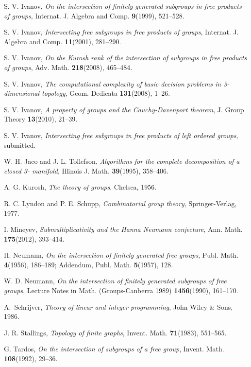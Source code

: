 \documentclass[10pt, reqno]{amsart}
\numberwithin{equation}{section}
\begin{document}
\begin{thebibliography}{[10]}
  S. V. Ivanov, {\em  On the intersection of
finitely generated subgroups in free products of groups},  {
Internat. J. Algebra and Comp.}  {\bf 9}(1999), 521--528.

  S. V. Ivanov, {\em Intersecting free subgroups
in free products of groups},  { Internat. J. Algebra and Comp.}
{\bf 11}(2001), 281--290.

 S. V. Ivanov,  {\em On the Kurosh rank of the
intersection of subgroups in free products of groups}, Adv.  Math. {\bf
218}(2008), 465--484.

 S. V. Ivanov,  {\em The computational complexity of basic decision problems in 3-dimensional topology},  Geom. Dedicata {\bf 131}(2008), 1--26.

  S. V. Ivanov,
{\em A property of groups and the Cauchy-Davenport theorem},
{J. Group Theory} {\bf 13}(2010), 21--39.

  S. V. Ivanov, {\em Intersecting free subgroups in free products of left ordered groups}, submitted.

  W. H. Jaco and J. L. Tollefson, {\em Algorithms for the complete decomposition of a closed 3-
manifold}, Illinois J. Math. {\bf 39}(1995), 358--406.

 A. G. Kurosh, {\em The theory of groups},
Chelsea, 1956.

 R. C. Lyndon and P. E. Schupp, {\em Combinatorial
group theory}, Springer-Verlag, 1977.

 I. Mineyev, {\em Submultiplicativity and the Hanna Neumann conjecture},  Ann.  Math. {\bf 175}(2012), 393--414.

  H. Neumann, {\em On the intersection of finitely generated
free groups}, {  Publ. Math.} {\bf  4}(1956), 186--189; Addendum,
{ Publ. Math.} {\bf  5}(1957), 128.

 W. D. Neumann, {\em On the intersection of finitely
generated subgroups of free groups},   { Lecture Notes in Math.
(Groups-Canberra 1989)}  {\bf  1456}(1990), 161--170.

A.~Schrijver, {\em  Theory of linear and integer programming},
John Wiley \& Sons, 1986.

  J. R. Stallings, {\em Topology of finite
graphs},  {Invent. Math.} {\bf  71}(1983), 551--565.

   G. Tardos, {\em On the intersection of subgroups
of a free group}, { Invent. Math.} {\bf  108}(1992), 29--36.
\end{thebibliography}
\end{document}
